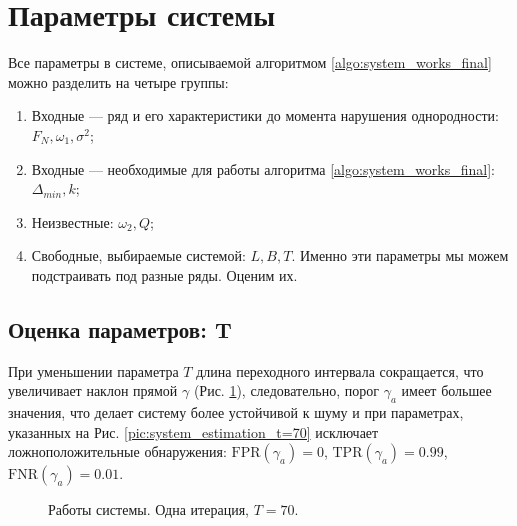\documentclass[specialist, substylefile = spbu.rtx,
			   subf, href, 12pt]{disser}
\begin{document}
\section{Параметры системы}\label{sec:system_parameters}

Все параметры в системе, описываемой алгоритмом \ref{algo:system_works_final} можно разделить на четыре группы:
\begin{enumerate}
	\item Входные --- ряд и его характеристики до момента нарушения однородности: \newline $ F_N, \omega_1, \sigma^2 $;
	\item Входные --- необходимые для работы алгоритма \ref{algo:system_works_final}: $ \Delta_{min}, k $;
	\item Неизвестные: $ \omega_2, Q $;
	\item Свободные, выбираемые системой: $ L, B, T $. Именно эти параметры мы можем подстраивать под разные ряды. Оценим их.
\end{enumerate}

\subsection{Оценка параметров: T}

При уменьшении параметра $ T $ длина переходного интервала сокращается, что увеличивает наклон прямой $ \gamma $ (Рис. \ref{pic:system_estimation_one_iter_t=70}), следовательно, порог $ \gamma_a $ имеет большее значения, что делает систему более устойчивой к шуму и при параметрах, указанных на Рис. \ref{pic:system_estimation_t=70} исключает ложноположительные обнаружения: $ \mathrm{FPR}(\gamma_a) = 0 $, $ \mathrm{TPR}(\gamma_a) = 0.99 $,  $ \mathrm{FNR}(\gamma_a) = 0.01 $.

\begin{figure}[!hhh]
	\caption{Работы системы. Одна итерация, $ T = 70 $.}
	\label{pic:system_estimation_one_iter_t=70}
\end{figure}
\end{document}
